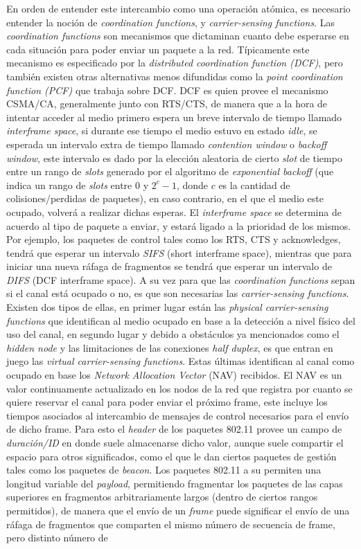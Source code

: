 \documentclass[10pt,a4paper]{article}
\begin{document}
En orden de entender este intercambio como una operación atómica, es necesario entender la noción de \textit{coordination functions}, y \textit{carrier-sensing functions}. Las \textit{coordination functions} son mecanismos que dictaminan cuanto debe esperarse en cada situación para poder enviar un paquete a la red. Típicamente este mecanismo es especificado por la \textit{distributed coordination function (DCF)}, pero también existen otras alternativas menos difundidas como la \textit{point coordination function (PCF)} que trabaja sobre DCF. DCF es quien provee el mecanismo CSMA/CA, generalmente junto con RTS/CTS, de manera que a la hora de intentar acceder al medio primero espera un breve intervalo de tiempo llamado \textit{interframe space}, si durante ese tiempo el medio estuvo en estado \textit{idle}, se esperada un intervalo extra de tiempo llamado \textit{contention window} o \textit{backoff window}, este intervalo es dado por la elección aleatoria de cierto \textit{slot} de tiempo entre un rango de \textit{slots} generado por el algoritmo de \textit{exponential backoff} (que indica un rango de \textit{slots} entre  $0$ y $2^{c} - 1$, donde $c$ es la cantidad de colisiones/perdidas de paquetes), en caso contrario, en el que el medio este ocupado, volverá a realizar dichas esperas. El \textit{interframe space} se determina de acuerdo al tipo de paquete a enviar, y estará ligado a la prioridad de los mismos. Por ejemplo, los paquetes de control tales como los RTS, CTS y acknowledges, tendrá que esperar un intervalo \textit{SIFS} (short interframe space), mientras que para iniciar una nueva ráfaga de fragmentos se tendrá que esperar un intervalo de \textit{DIFS} (DCF interframe space). A su vez para que las \textit{coordination functions} sepan si el canal está ocupado o no, es que son necesarias las \textit{carrier-sensing functions}. Existen dos tipos de ellas, en primer lugar están las \textit{physical carrier-sensing functions} que identifican al medio ocupado en base a la detección a nivel físico del uso del canal, en segundo lugar y debido a obstáculos ya mencionados como el \textit{hidden node} y las limitaciones de las conexiones \textit{half duplex}, es que entran en juego las \textit{virtual carrier-sensing functions}. Estas últimas identifican al canal como ocupado en base los \textit{Network Allocation Vector} (NAV) recibidos. El NAV es un valor continuamente actualizado en los nodos de la red que registra por cuanto se quiere reservar el canal para poder enviar el próximo frame, este incluye los tiempos asociados al intercambio de mensajes de control necesarios para el envío de dicho frame. Para esto el \textit{header} de los paquetes 802.11 provee un campo de \textit{duración/ID} en donde suele almacenarse dicho valor, aunque suele compartir el espacio para otros significados, como el que le dan ciertos paquetes de gestión tales como los paquetes de \textit{beacon}. Los paquetes 802.11 a su permiten una longitud variable del \textit{payload}, permitiendo fragmentar los paquetes de las capas superiores en fragmentos arbitrariamente largos (dentro de ciertos rangos permitidos), de manera que el envío de un \textit{frame} puede significar el envío de una ráfaga de fragmentos que comparten el mismo número de secuencia de frame, pero distinto número de 
\end{document}
